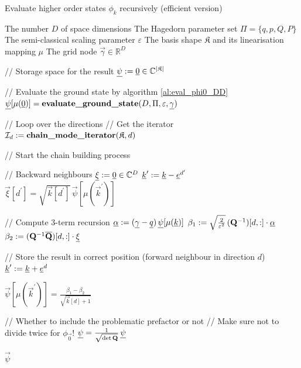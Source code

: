 \begin{algorithm}
  \caption{Evaluate higher order states $\phi_k$ recursively (efficient version)}
  \label{al:eval_phik_DD}
  \begin{algorithmic}
    \REQUIRE The number $D$ of space dimensions
    \REQUIRE The Hagedorn parameter set $\Pi = \{q,p,Q,P\}$
    \REQUIRE The semi-classical scaling parameter $\varepsilon$
    \REQUIRE The basis shape $\mathfrak{K}$ and its linearisation mapping $\mu$
    \REQUIRE The grid node $\vec{\gamma} \in \mathbb{R}^D$

    \STATE // Storage space for the result
    \STATE $\vec{\psi} \assign \vec{0} \in \mathbb{C}^{|\mathfrak{K}|}$

    \STATE // Evaluate the ground state by algorithm \ref{al:eval_phi0_DD}
    \STATE $\vec{\psi}[\mu(\vec{0})] = \text{\bf{evaluate\_ground\_state}}(D, \Pi, \varepsilon, \vec{\gamma})$

    \STATE // Loop over the directions
      \STATE // Get the iterator
      \STATE $\mathcal{I}_d \assign \text{\bf{chain\_mode\_iterator}}(\mathfrak{K}, d)$

      \STATE // Start the chain building process

        \STATE // Backward neighbours
        \STATE $\vec{\xi} \assign \vec{0} \in \mathbb{C}^{D}$
          \STATE $\vec{k}^\prime \assign \vec{k} - \vec{e}^{d^\prime}$
            \STATE $\vec{\xi}[d^\prime] = \sqrt{\vec{k}[d^\prime]} \, \vec{\psi}[\mu(\vec{k}^\prime)]$
          \ENDIF
        \ENDFOR

        \STATE // Compute 3-term recursion
        \STATE $\vec{\alpha} \assign (\vec{\gamma} - \vec{q}) \, \vec{\psi}[\mu(\vec{k})]$
        \STATE $\beta_1 \assign \sqrt{\frac{2}{\varepsilon^2}} \, (\mat{Q}\inv)[d,:] \cdot \vec{\alpha}$
        \STATE $\beta_2 \assign (\mat{Q}\inv \conj{\mat{Q}})[d,:] \cdot \vec{\xi}$

        \STATE // Store the result in correct position (forward neighbour in direction $d$)
        \STATE $\vec{k}^\prime \assign \vec{k} + \vec{e}^d$

          \STATE $\vec{\psi}[\mu(\vec{k}^\prime)] = \frac{\beta_1 - \beta_2}{\sqrt{\vec{k}[d] + 1}}$
        \ENDIF
      \ENDFOR
    \ENDFOR

  \STATE // Whether to include the problematic prefactor or not
  \STATE // Make sure not to divide twice for $\phi_{\vec{0}}$!
    \STATE $\vec{\psi} = \frac{1}{\sqrt{\det\mat{Q}}} \, \vec{\psi}$
  \ENDIF

  \RETURN $\vec{\psi}$
\end{algorithmic}
\end{algorithm}


